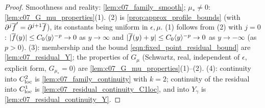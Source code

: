 \begin{proof}
  Smoothness and reality: \cref{lem:c07_family_smooth}; $\mu_*\neq0$: \cref{lem:c07_G_mu_properties}(1).
  (2) is \cref{prop:approx_profile_bounds} (with $\partial^j\overline{f}'=\partial^{j+1}\overline{f}$), its constants being uniform in $\epsilon,\mu$.
  (1) follows from (2) with $j=0$: $|\overline{f}(y)|\le C_0\langle y \rangle^{-p}\to0$ as $y\to\infty$ and
  $|\overline{f}(y)+y|\le C_0\langle y \rangle^{-p}\to0$ as $y\to-\infty$ (as $p>0$).
  (3): membership and the bound \eqref{eqn:fixed_point_residual_bound} are \cref{lem:c07_residual_Y}; the
  properties of $G_\mu$ (Schwartz, real, independent of $\epsilon$, explicit form, $G_{\mu_*}=0$) are
  \cref{lem:c07_G_mu_properties}(1)--(2).
  (4): continuity into $C^2_{\textup{loc}}$ is \cref{lem:c07_family_continuity} with $k=2$; continuity of the residual into
  $C^1_{\textup{loc}}$ is \cref{lem:c07_residual_continuity_C1loc}, and into $Y_\gamma$ is \cref{lem:c07_residual_continuity_Y}.
\end{proof}
